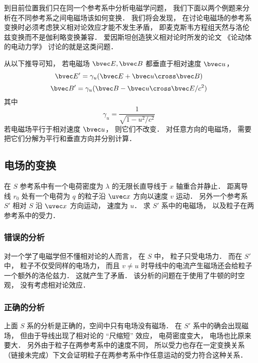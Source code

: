 
\begin{issues}
\issueDraft
\end{issues}


到目前位置我们只在同一个参考系中分析电磁学问题， 我们下面以两个例题来分析在不同参考系之间电磁场该如何变换． 我们将会发现， 在讨论电磁场的参考系变换时必须考虑狭义相对论效应才能不发生矛盾， 即麦克斯韦方程组天然与洛伦兹变换而不是伽利略变换兼容． 爱因斯坦创造狭义相对论时所发的论文 《论动体的电动力学》 讨论的就是这类问题．

从以下推导可知， 若电磁场 $\bvec E, \bvec B$ 都垂直于相对速度 $\bvec u$，%
\begin{equation}\label{EMRef_eq1}
\bvec E' = \gamma_u (\bvec E + \bvec u \cross \bvec B)
\end{equation}
\begin{equation}\label{EMRef_eq2}
\bvec B' = \gamma_u (\bvec B - \bvec u \cross \bvec E/c^2)
\end{equation}
其中
\begin{equation}
\gamma_u = \frac{1}{\sqrt{1 - u^2/c^2}}
\end{equation}
若电磁场平行于相对速度 $\bvec u$， 则它们不改变． 对任意方向的电磁场， 需要把它们分解为平行和垂直方向并分别计算．

\subsection{电场的变换}
在 $S$ 参考系中有一个电荷密度为 $\lambda$ 的无限长直导线于 $x$ 轴重合并静止． 距离导线 $r_0$ 处有一个电荷为 $q$ 的粒子沿 $\uvec x$ 方向以速度 $v$ 运动． 另外一个参考系 $S'$ 相对 $S$ 沿 $\uvec x$ 方向运动， 速度为 $u$． 求 $S'$ 系中的电磁场， 以及粒子在两参考系中的受力．

\subsubsection{错误的分析}
对一个学了电磁学但不懂相对论的人而言， 在 $S$ 中， 粒子只受电场力． 而在 $S'$ 中， 粒子不仅受同样的电场力， 而且 $v \ne u$ 时导线中的电流产生磁场还会给粒子一个额外的洛伦兹力． 这就产生了矛盾． 该分析的问题在于使用了牛顿的时空观， 没有考虑相对论效应．

\subsubsection{正确的分析}
上面 $S$ 系的分析是正确的，空间中只有电场没有磁场． 在 $S'$ 系中的确会出现磁场， 但由于导线出现了相对论的 “尺缩短” 效应， 电荷密度变大， 电场也比原来要大． 另外由于粒子在两参考系中的速度不同， 所以受力也存在一定变换关系（链接未完成）下文会证明粒子在两参考系中作任意运动的受力符合这种关系．

